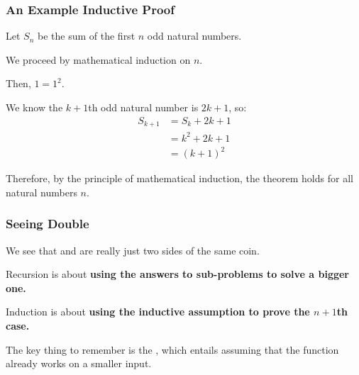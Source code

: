 \documentclass[aspectratio=169]{beamer}
\begin{document}
\begin{frame}[fragile]
  \frametitle{An Example Inductive Proof}
 
  { \small
  Let $S_n$ be the sum of the first $n$ odd natural numbers.

  \pause
  \vspace{\fill}


  \pause
  \vspace{\fill}

  We proceed by mathematical induction on $n$. 

  \vspace{\fill}
  
  Then, $1 = 1^2$.

  \vspace{\fill}



  \vspace{\fill}

  We know the $k + 1$th odd natural number is $2k + 1$, so: 
  \begin{align*} 
    S_{k + 1} &= S_k + 2k + 1 \\
              &= k^2 + 2k + 1 \\
              &= (k + 1)^2 
  \end{align*}

  Therefore, by the principle of mathematical induction, the theorem holds 
  for all natural numbers $n$.
  }
\end{frame}

\begin{frame}[fragile]
  \frametitle{Seeing Double} 

  We see that  and  are really just two sides of the same coin.

  \pause
  \vspace{\fill}

  Recursion is about \textbf{using the answers to sub-problems to solve a bigger one.}

  \pause
  \vspace{\fill}

  Induction is about \textbf{using the inductive assumption to prove the $n + 1$th case.}

  \pause
  \vspace{\fill}

  The key thing to remember is the , which entails
  assuming that the function already works on a smaller input.

  \ptmt
\end{frame}
\end{document}
